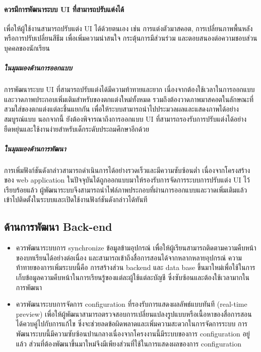 \paragraph{ควรมีการพัฒนาระบบ UI ที่สามารถปรับแต่งได้}
เพื่อให้ผู้ใช้งานสามารถปรับแต่ง UI ได้ด้วยตนเอง เช่น การแต่งตัวมาสคอต, การเปลี่ยนภาพพื้นหลัง หรือการปรับเปลี่ยนสีธีม เพื่อเพิ่มความน่าสนใจ 
กระตุ้นการมีส่วนร่วม และตอบสนองต่อความชอบส่วนบุคคลของนักเรียน 
\subparagraph{ในมุมมองด้านการออกแบบ}
การพัฒนาระบบ UI ที่สามารถปรับแต่งได้มีความท้าทายและยาก เนื่องจากต้องใช้เวลาในการออกแบบและวาดภาพประกอบเพิ่มเติมสำหรับของตกแต่งใหม่ทั้งหมด 
รวมถึงต้องวาดภาพมาสคอตในลักษณะที่สวมใส่ของตกแต่งแต่ละชิ้นแยกกัน เพื่อให้ระบบสามารถนำไปประมวลผลและแสดงภาพได้อย่างสมบูรณ์แบบ 
นอกจากนี้ ยังต้องพิจารณาถึงการออกแบบ UI ที่สามารถรองรับการปรับแต่งได้อย่างยืดหยุ่นและใช้งานง่ายสำหรับเด็กระดับประถมศึกษาอีกด้วย
\subparagraph{ในมุมมองด้านการพัฒนา}
การเพิ่มฟังก์ชันดังกล่าวสามารถดำเนินการได้อย่างรวดเร็วและมีความซับซ้อนต่ำ เนื่องจากโครงสร้างของ web application ในปัจจุบันได้ถูกออกแบบมาให้รองรับการจัดการระบบการปรับแต่ง UI ไว้เรียบร้อยแล้ว 
ผู้พัฒนาระบบจึงสามารถนำไฟล์ภาพประกอบที่ผ่านการออกแบบและวาดเพิ่มเติมแล้ว เข้าไปติดตั้งในระบบและเปิดใช้งานฟังก์ชันดังกล่าวได้ทันที


\subsection*{ด้านการพัฒนา Back-end}
\begin{itemize}
    \item ควรพัฒนาระบบการ synchronize ข้อมูลข้ามอุปกรณ์ เพื่อให้ผู้เรียนสามารถติดตามความคืบหน้าของบทเรียนได้อย่างต่อเนื่อง และสามารถเข้าถึงสื่อการสอนได้จากหลากหลายอุปกรณ์ 
    ความท้าทายของการเพิ่มระบบนี้คือ การสร้างส่วน backend และ data base ขึ้นมาใหม่เพื่อใช้ในการเก็บข้อมูลความคืบหน้าในการเรียนรู้ของแต่ละผู้ใช้แต่ละบัญชี ซึ่งซับซ้อนและต้องใช้เวลามากในการพัฒนา 
    \item ควรพัฒนาระบบการจัดการ configuration ที่รองรับการแสดงผลลัพธ์แบบทันที (real-time preview) เพื่อให้ผู้พัฒนาสามารถตรวจสอบการเปลี่ยนแปลงรูปแบบหรือเนื้อหาของสื่อการสอนได้ควบคู่ไปกับการแก้ไข 
    ซึ่งจะช่วยลดข้อผิดพลาดและเพิ่มความสะดวกในการจัดการระบบ การพัฒนาระบบนี้มีความซับซ้อนปานกลางเนื่องจากโครงงานนี้มีระบบของการ configuration อยู่แล้ว 
    ส่วนที่ต้องพัฒนาขึ้นมาใหม่จึงมีเพียงส่วนที่ใช้ในการแสดงผลของการ configuration
\end{itemize}